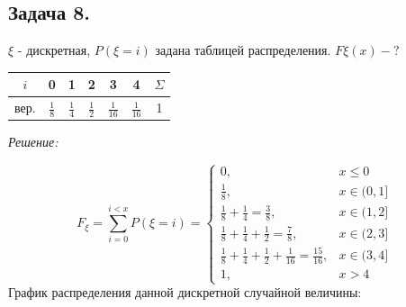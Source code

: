 \subsection*{Задача 8.}

$\xi$ - дискретная, $P(\xi = i)$ задана таблицей распределения. $F\xi(x) - ?$
\begin{table}[H]
	\centering\makegapedcells
	\begin{tabular}{|c|c|c|c|c|c|c|}
		\hline
		$i$  & 0             & 1             & 2             & 3              & 4              & $\Sigma$ \\ \hline
		вер. & $\frac{1}{8}$ & $\frac{1}{4}$ & $\frac{1}{2}$ & $\frac{1}{16}$ & $\frac{1}{16}$ & 1        \\ \hline
	\end{tabular}
\end{table}

\noindent \textit{Решение:}

\[ F_{\xi} = \sum_{i=0}^{i<x} P(\xi = i) =
\begin{cases}
	0, &x \le 0 \\
	\frac{1}{8}, &x \in (0,1] \\
	\frac{1}{8} + \frac{1}{4} = \frac{3}{8}, &x \in (1,2] \\
	\frac{1}{8} + \frac{1}{4} + \frac{1}{2} = \frac{7}{8}, &x \in (2,3] \\
	\frac{1}{8} + \frac{1}{4} + \frac{1}{2} + \frac{1}{16} = \frac{15}{16}, &x \in (3,4] \\
	1, &x > 4
\end{cases}
\]
График распределения данной дискретной случайной величины:
\begin{figure}[H]
\end{figure}

